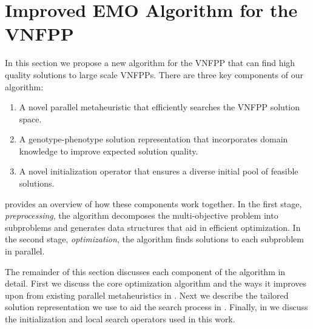 \section{Improved EMO Algorithm for the VNFPP}
\label{sec:optimisation}
In this section we propose a new algorithm for the VNFPP that can find high quality solutions to large scale VNFPPs. There are three key components of our algorithm: 
\begin{enumerate}
    \item A novel parallel metaheuristic that efficiently searches the VNFPP solution space.
    \item A genotype-phenotype solution representation that incorporates domain knowledge to improve expected solution quality.
    \item A novel initialization operator that ensures a diverse initial pool of feasible solutions.
\end{enumerate}
 provides an overview of how these components work together. In the first stage, \textit{preprocessing}, the algorithm decomposes the multi-objective problem into subproblems and generates data structures that aid in efficient optimization. In the second stage, \textit{optimization}, the algorithm finds solutions to each subproblem in parallel.

The remainder of this section discusses each component of the algorithm in detail. First we discuss the core optimization algorithm and the ways it improves upon from existing parallel metaheuristics in . Next we describe the tailored solution representation we use to aid the search process in . Finally, in  we discuss the initialization and local search operators used in this work. 

